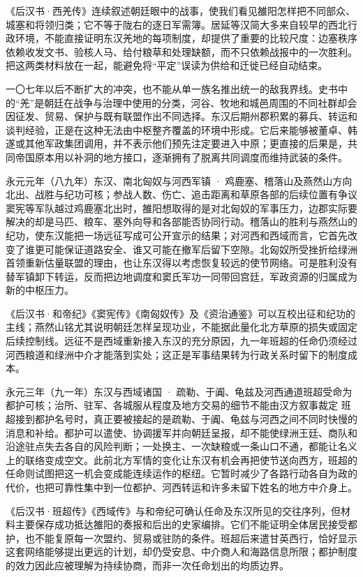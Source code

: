《后汉书·西羌传》连续叙述朝廷眼中的战事，使我们看见雒阳怎样把不同部众、城塞和将领归类；它不等于陇右的逐日军需簿。居延等汉简大多来自较早的西北行政环境，不能直接证明东汉羌地的每项制度，却提供了重要的比较尺度：边塞秩序依赖收发文书、验核人马、给付粮草和处理缺额，而不只依赖战报中的一次胜利。把这两类材料放在一起，能避免将“平定”误读为供给和迁徙已经自动结束。

一〇七年以后不断扩大的冲突，也不能从单一族名推出统一的敌我界线。史书中的“羌”是朝廷在战争与治理中使用的分类，河谷、牧地和城邑周围的不同社群却会因征发、贸易、保护与既有联盟作出不同选择。东汉后期州郡积累的募兵、转运和谈判经验，正是在这种无法由中枢整齐覆盖的环境中形成。它后来能够被董卓、韩遂或其他军政集团调用，并不表示他们预先注定要进入中原；更直接的后果是，共同帝国原本用以补洞的地方接口，逐渐拥有了脱离共同调度而维持武装的条件。

\begin{event}{}{永元元年（八九年）}{东汉、南北匈奴与河西军镇 · 鸡鹿塞、稽落山及燕然山方向}{北出、战胜与纪功可核；参战人数、伤亡、追击距离和草原各部的后续位置有争议}
窦宪等军队越过鸡鹿塞北出时，雒阳想取得的是对北匈奴的军事压力，边郡实际要解决的却是马匹、粮车、塞外向导和各部能否协同行动。稽落山的胜利与燕然山的纪功，使东汉能把一场远征写成可公开宣示的结果；对河西和西域而言，它首先改变了谁更可能保证道路安全、谁又可能在撤军后留下空隙。北匈奴所受挫折给绿洲首领重新估量联盟的理由，也让东汉得以考虑恢复较远的使节网络。可是胜利没有替军镇卸下转运，反而把边地调度和窦氏军功一同带回宫廷，军政资源的归属成为新的中枢压力。

《后汉书·和帝纪》《窦宪传》《南匈奴传》及《资治通鉴》可以互校出征和纪功的主线；燕然山铭尤其说明朝廷怎样呈现功业，不能据此量化北方草原的损失或固定后续控制线。远征不是西域重新接入东汉的充分原因，九一年班超的任命仍须经过河西粮道和绿洲中介才能落到实处；这正是军事结果转为行政关系时留下的制度成本。
\end{event}

\begin{event}{}{永元三年（九一年）}{东汉与西域诸国 · 疏勒、于阗、龟兹及河西通道}{班超受命为都护可核；治所、驻军、各城服从程度及地方交易的细节不能由汉方叙事裁定}
班超接到都护名号时，真正要被接起的是疏勒、于阗、龟兹与河西之间不同时快慢的消息和补给。都护可以遣使、协调援军并向朝廷呈报，却不能使绿洲王廷、商队和沿途驻点失去各自的风险判断；一处换主、一次缺粮或一条山口不通，都能让名义上的联络变成空文。此前北方军情的变化让东汉有机会再把使节送向西方，班超的任命则试图把这一机会变成能连续运作的枢纽。它暂时减少了各路行动各自为政的代价，也把可靠性集中到一位都护、河西转运和许多未留下姓名的地方中介身上。

《后汉书·班超传》《西域传》与和帝纪可确认任命及东汉所见的交往序列，但材料主要保存成功抵达雒阳的奏报和后出的史家编排。它们不能证明全体居民接受都护，也不能复原每一次盟约、贸易或驻防的条件。班超后来遣甘英西行，恰好显示这套网络能够提出更远的计划，却仍受安息、中介商人和海路信息所限；都护制度的效力因此应被理解为持续协商，而非一次任命划出的均质边界。
\end{event}

